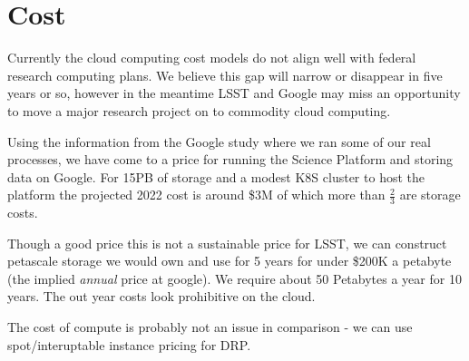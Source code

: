 
\section{Cost}
Currently the cloud computing cost models do  not align well with federal research computing plans. We believe this gap will narrow or disappear in five years or so, however in the meantime LSST and Google may miss an opportunity to move a major research project on to commodity cloud computing.

Using the information from the Google study where we ran some of our real processes, we have come to a price for running the \gls{Science Platform} and storing data on Google. For 15PB of storage and a modest K8S cluster to host the platform the projected 2022 cost is around \$3M of which more than $\frac{2}{3}$ are storage costs.

Though a good price this is not a sustainable price for \gls{LSST}, we can construct petascale storage we would own and use for 5 years for under \$200K a petabyte (the implied \emph{annual} price at google).  We require about 50 Petabytes a year for 10 years. The out year costs look prohibitive on the cloud.

The cost of compute is probably not an issue in comparison - we can use spot/interuptable instance pricing for \gls{DRP}.

%
